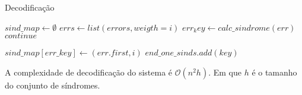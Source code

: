 \begin{algorithm}
	\caption{Decodificação}\label{alg:update_sindromes}
	\begin{algorithmic}[Message]
		\State $sind\_map \gets \emptyset$
			\State $errs \gets list(errors, weigth=i)$
				\State $err_key \gets calc\_sindrome(err)$
					\State $continue$
				\EndIf
				
				\State $sind\_map[err\_key] \gets (err.first, i)$
				\EndIf
			\EndFor
		\EndFor
				\State $end\_one\_sinds.add(key)$
			\EndIf
		\EndFor
		\EndProcedure
	\end{algorithmic}
\end{algorithm}

A complexidade de decodificação do sistema é  $\mathcal{O}(n^2h)$. Em que $h$ é o tamanho do conjunto de síndromes.